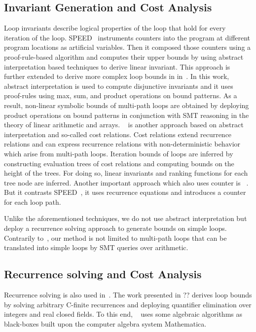 \subsection{Invariant Generation and Cost Analysis} 
Loop invariants describe logical properties of the loop that hold for every iteration of the loop. 
SPEED~\cite{speed1} instruments counters into the program at different program locations as artificial variables. Then it composed those counters using a proof-rule-based algorithm and computes their upper bounds by using abstract interpretation based techniques to derive linear invariant. 
This approach is further extended to derive more complex loop bounds in in~\cite{Gulwani:2010:RP:1806596.1806630}. 
In this work, 
abstract interpretation is used to compute disjunctive invariants and it uses proof-rules using max, sum, and product operations on bound patterns.
As a result, non-linear symbolic bounds of multi-path loops are obtained by deploying product operations on bound patterns in conjunction with SMT reasoning in the theory of linear arithmetic and arrays. 
 ~\cite{Albert:2011:CUB:1937961.1937986} is  another approach based on abstract interpretation and so-called cost relations. 
 Cost relations extend recurrence relations and can express recurrence relations with non-deterministic behavior which arise from multi-path loops. 
 Iteration bounds of loops are inferred by constructing evaluation trees of cost relations and computing bounds on the height of the trees. 
 For doing so, linear invariants and ranking functions for each tree node are inferred. 
 Another important approach which also uses counter is ~\cite{Knoop:2011:SLB:2341512.2341532}. But it contrasts SPEED~\cite{speed1}, it uses recurrence equations and introduces a counter for each loop path. 
 
 Unlike the aforementioned techniques, we do not use abstract interpretation but deploy a recurrence solving approach to generate bounds on simple loops. 
 Contrarily to~\cite{speed1,Gulwani:2010:RP:1806596.1806630,Albert:2011:CUB:1937961.1937986}, our method is not limited to multi-path loops that can be translated into simple loops by SMT queries over arithmetic.



\subsection{Recurrence solving and Cost Analysis} 
Recurrence solving is also used in~\cite{10.1007/978-3-642-17511-4_7,Henzinger:2008:VVT:1484209.1484240}.
The work presented in ?? derives loop bounds by solving arbitrary C-finite recurrences and deploying quantifier elimination over integers and real closed fields. 
To this end, ~\cite{Henzinger:2008:VVT:1484209.1484240} uses some algebraic algorithms as black-boxes built upon the computer algebra system Mathematica. 

